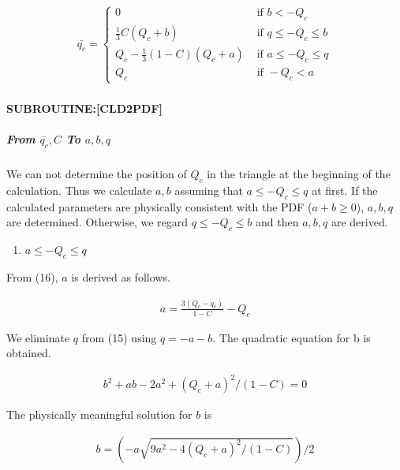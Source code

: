 \begin{eqnarray}
\bar{q_c}=\left\{\begin{array}{ll}
0 & \text { if } b<-Q_{c} \\
\frac{1}{3} C\left(Q_{c}+b\right) & \text { if } q \leq-Q_{c} \leq b \\
Q_{c}-\frac{1}{3}(1-C)\left(Q_{c}+a\right) & \text { if } a \leq-Q_{c} \leq q \\
Q_{c} & \text { if }-Q_{c}<a
\end{array}\right.
\label{E08-16}
\end{eqnarray}

\hypertarget{subroutinecld2pdf}{%
\paragraph{SUBROUTINE:{[}CLD2PDF{]}}\label{subroutinecld2pdf}}

\hypertarget{from-barq_c-c-to-abq}{%
\subparagraph{\texorpdfstring{From \(\bar{q_c}, C\) To
\(a,b,q\)}{From \textbackslash bar\{q\_c\}, C To a,b,q}}\label{from-barq_c-c-to-abq}}

We can not determine the position of \(Q_c\) in the triangle at the
beginning of the calculation. Thus we calculate \(a,b\) assuming that
\(a \leq-Q_{c} \leq q\) at first. If the calculated parameters are
physically consistent with the PDF (\(a+b \ge 0\)), \(a,b,q\) are
determined. Otherwise, we regard \(q \leq-Q_{c} \leq b\) and then
\(a,b,q\) are derived.

\begin{enumerate}
\def\labelenumi{\arabic{enumi}.}
\tightlist
\item
  \(a \leq-Q_{c} \leq q\)
\end{enumerate}

From (16), \(a\) is derived as follows.

\begin{eqnarray}
a =\frac{3\left(Q_{c}-q_{c}\right)}{1-C}-Q_{c}
\end{eqnarray}

We eliminate \(q\) from (15) using \(q = -a-b\). The quadratic equation
for b is obtained.

\begin{eqnarray}
b^{2}+ab-2a^{2}+\left(Q_{c}+a\right)^{2} /(1-C)=0
\label{E08-17}
\end{eqnarray}

The physically meaningful solution for \(b\) is

\begin{eqnarray}
b=\left(-a\sqrt{9 a^{2}-4\left(Q_{c}+a\right)^{2} /(1-C)}\right) / 2
\label{E08-18}
\end{eqnarray}

